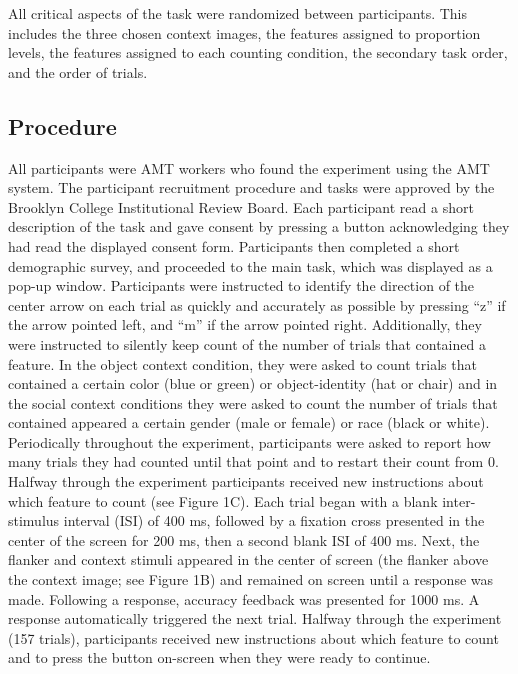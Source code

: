 \documentclass[english,,man,floatsintext]{apa6}
\begin{document}
All critical aspects of the task were randomized between participants. This includes the three chosen context images, the features assigned to proportion levels, the features assigned to each counting condition, the secondary task order, and the order of trials.

\hypertarget{procedure}{%
\subsection{Procedure}\label{procedure}}

All participants were AMT workers who found the experiment using the AMT system. The participant recruitment procedure and tasks were approved by the Brooklyn College Institutional Review Board. Each participant read a short description of the task and gave consent by pressing a button acknowledging they had read the displayed consent form. Participants then completed a short demographic survey, and proceeded to the main task, which was displayed as a pop-up window. Participants were instructed to identify the direction of the center arrow on each trial as quickly and accurately as possible by pressing \enquote{z} if the arrow pointed left, and \enquote{m} if the arrow pointed right. Additionally, they were instructed to silently keep count of the number of trials that contained a feature. In the object context condition, they were asked to count trials that contained a certain color (blue or green) or object-identity (hat or chair) and in the social context conditions they were asked to count the number of trials that contained appeared a certain gender (male or female) or race (black or white). Periodically throughout the experiment, participants were asked to report how many trials they had counted until that point and to restart their count from 0. Halfway through the experiment participants received new instructions about which feature to count (see Figure 1C).
Each trial began with a blank inter-stimulus interval (ISI) of 400 ms, followed by a fixation cross presented in the center of the screen for 200 ms, then a second blank ISI of 400 ms. Next, the flanker and context stimuli appeared in the center of screen (the flanker above the context image; see Figure 1B) and remained on screen until a response was made. Following a response, accuracy feedback was presented for 1000 ms. A response automatically triggered the next trial.
Halfway through the experiment (157 trials), participants received new instructions about which feature to count and to press the button on-screen when they were ready to continue.
\end{document}
